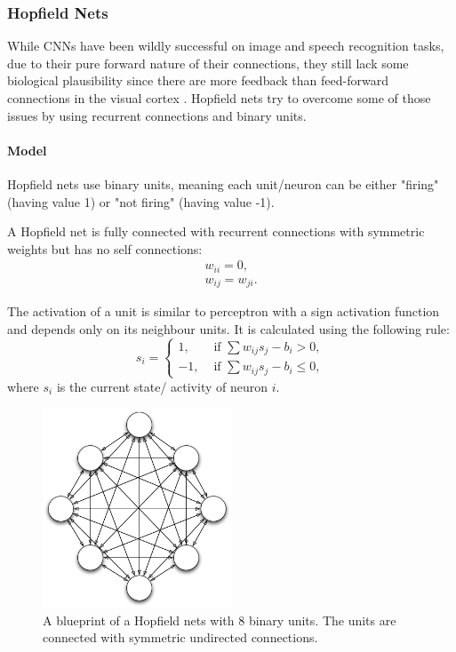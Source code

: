 \subsubsection{Hopfield Nets}

While CNNs have been wildly successful on image and speech recognition tasks, due to their pure forward nature of their connections, they still lack some biological plausibility since there are more feedback than feed-forward connections in the visual cortex .
Hopfield nets try to overcome some of those issues by using recurrent connections and binary units.

\paragraph{Model}

Hopfield nets use binary units, meaning each unit/neuron can be either "firing" (having value 1) or "not firing" (having value -1). 

A Hopfield net  is fully connected with recurrent connections with symmetric weights but has no self connections:
\[
\begin{split}
w_{ii} = 0 , \\
w_{ij} = w_{ji} .
\end{split}
\]

The activation of a unit is similar to perceptron with a sign activation function and depends only on its neighbour units. It is calculated using the following rule:
\[
	s_i = 
		\begin{cases}
			1, & \text{  if  } \sum w_{ij} s_{j} - b_{i}> 0 , \\
			-1, & \text{  if  } \sum w_{ij} s_{j} - b_{i} \le 0,
		\end{cases}	
\]
where $s_i$ is the current state/ activity of neuron $i$.

\begin{figure}
	\centering
    	\includegraphics[width=0.5\textwidth]{imgs/hopfield.png} 
    \caption{A blueprint of a Hopfield nets with 8 binary units. The units are connected with symmetric undirected connections.}
	\label{fig:hopfiled}
\end{figure}


